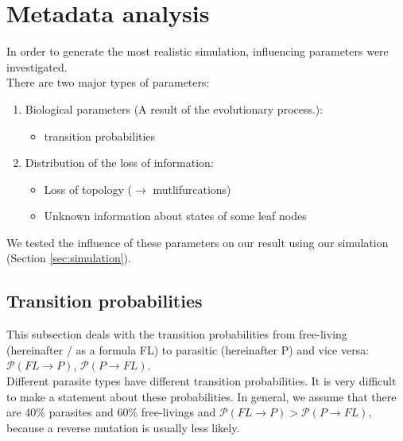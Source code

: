   \section{Metadata analysis}
    In order to generate the most realistic simulation, influencing parameters were investigated. \\
    There are two major types of parameters:
    \begin{enumerate}
      \item Biological parameters (A result of the evolutionary process.):
        \begin{itemize}
          \item transition probabilities
        \end{itemize}
      \item Distribution of the loss of information:
        \begin{itemize}
          \item Loss of topology ($\rightarrow$ mutlifurcations)
          \item Unknown information about states of some leaf nodes
        \end{itemize}
    \end{enumerate}
    We tested the influence of these parameters on our result using our simulation (Section 
      \ref{sec:simulation}).
   
    \subsection{Transition probabilities}
      This subsection deals with the transition probabilities from free-living (hereinafter / as a 
        formula FL) to parasitic (hereinafter P) and vice versa: $\mathcal{P}(FL \rightarrow P)$, 
        $\mathcal{P}(P \rightarrow FL)$. \\
      Different parasite types have different transition probabilities. It is very difficult to make a 
        statement about these probabilities.
      In general, we assume that there are 40\% parasites and 60\% free-livings  and 
        $\mathcal{P}(FL \rightarrow P) > \mathcal{P}(P \rightarrow FL)$, because a reverse mutation is 
        usually less likely.  \\

